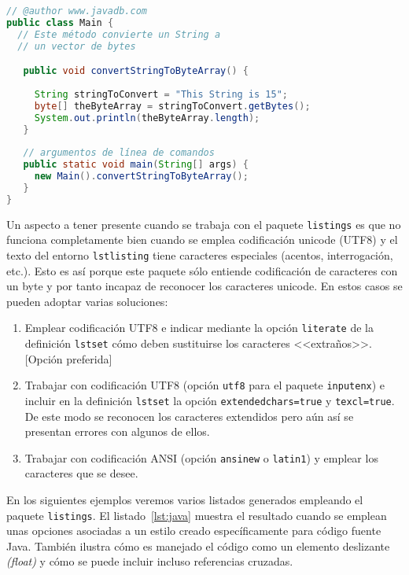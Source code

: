 \documentclass[11pt,a4paper]{article}
\begin{document}
\begin{lstlisting}[language=Java,style=Java-color,float=ht,caption={[Código fuente en Java]Ejemplo de código fuente en lenguaje Java},label=lst:java]
// @author www.javadb.com
public class Main {    
  // Este método convierte un String a
  // un vector de bytes

   public void convertStringToByteArray() {
        
     String stringToConvert = "This String is 15";      
     byte[] theByteArray = stringToConvert.getBytes();        
     System.out.println(theByteArray.length);        
   }
    
   // argumentos de línea de comandos 
   public static void main(String[] args) {
     new Main().convertStringToByteArray();
   }
}
\end{lstlisting}

Un aspecto a tener presente cuando se trabaja con el paquete \texttt{listings} es que no funciona completamente bien cuando se emplea codificación unicode (UTF8) y el texto del entorno \texttt{lstlisting} tiene caracteres especiales (acentos, interrogación, etc.). Esto es así porque este paquete sólo entiende codificación de caracteres con un byte y por tanto incapaz de reconocer los caracteres unicode. En estos casos se pueden adoptar varias soluciones: 

\begin{enumerate}
	\item Emplear codificación UTF8 e indicar mediante la opción \texttt{literate} de la definición \texttt{lstset} cómo deben sustituirse los caracteres <<extraños>>. [Opción preferida]
	\item Trabajar con codificación UTF8 (opción \texttt{utf8} para el paquete \texttt{inputenx}) e incluir en la definición \texttt{lstset} la opción \texttt{extendedchars=true} y \texttt{texcl=true}. De este modo se reconocen los caracteres extendidos pero aún así se presentan errores con algunos de ellos.
	\item Trabajar con codificación ANSI (opción \texttt{ansinew} o \texttt{latin1}) y emplear los caracteres que se desee.
\end{enumerate}

En los siguientes ejemplos veremos varios listados generados empleando el paquete \texttt{listings}. El listado~\ref{lst:java} muestra el resultado cuando se emplean unas opciones asociadas a un estilo creado específicamente para código fuente Java. También ilustra cómo es manejado el código como un elemento deslizante \emph{(float)} y cómo se puede incluir incluso referencias cruzadas.
\end{document}
